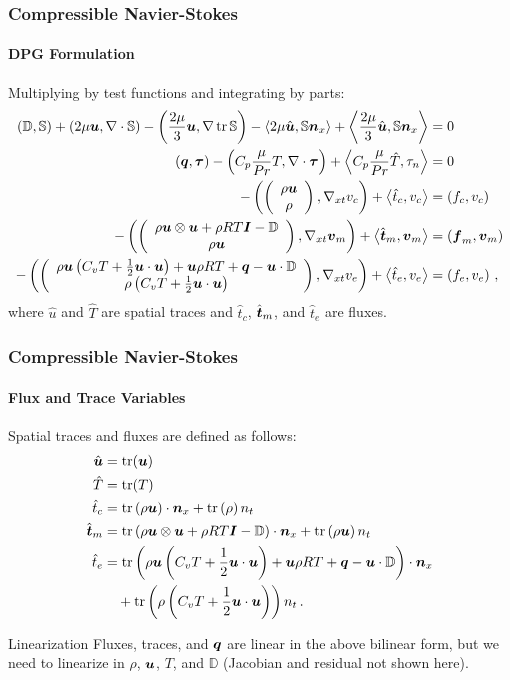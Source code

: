 \documentclass[18pt,xcolor=table]{beamer}
\begin{document}
\begin{frame}[t]
\frametitle{Compressible Navier-Stokes}
\framesubtitle{DPG Formulation}  %
Multiplying by test functions and integrating by parts:
{
\small
\begin{align*}
  \LRp{\mathbb{D},\mathbb{S}}+\LRp{2\mu\bfu,\Div\mathbb{S}}-\LRp{\frac{2\mu}{3}\bfu,\Grad\trace{\mathbb{S}}}
  -\LRa{2\mu\hat\bfu,\mathbb{S}\bfn_x}+\LRa{\frac{2\mu}{3}\hat\bfu,\mathbb{S}\bfn_x}&=0\\
  \LRp{\bfq,\bftau}-\LRp{C_p\frac{\mu}{Pr}T,\Div\bftau}+\LRa{C_p\frac{\mu}{Pr}\hat T,\tau_n}&=0\\
  -\LRp{\vecttwo{\rho\bfu}{\rho},\Gradxt v_c}+\LRa{\hat t_c,v_c}&=\LRp{f_c,v_c}\\
  -\LRp{\vecttwo{\rho\bfu\otimes\bfu+\rho RT\bfI-\mathbb{D}}{\rho\bfu},\Gradxt\bfv_m}+\LRa{\hat\bft_m,\bfv_m}&=\LRp{\bff_m,\bfv_m}\\
  -\LRp{\vecttwo{\rho\bfu\LRp{C_v T+\frac{1}{2}\bfu\cdot\bfu}+\bfu\rho RT+\bfq-\bfu\cdot\mathbb{D}}{\rho\LRp{C_v T+\frac{1}{2}\bfu\cdot\bfu}},\Gradxt v_e}
  +\LRa{\hat t_e,v_e}&=\LRp{f_e,v_e}\,,
\end{align*}
}
where $\hat u$ and $\hat T$ are spatial traces and $\hat t_c$, $\hat\bft_m$, and $\hat t_e$ are fluxes.
\end{frame}


\begin{frame}[t]
\frametitle{Compressible Navier-Stokes}
\framesubtitle{Flux and Trace Variables}  %
Spatial traces and fluxes are defined as follows:
\begin{equation*}
\begin{aligned}
\hat\bfu&=\trace(\bfu)\\
\hat T&=\trace(T)\\
\hat t_c&=\trace\LRp{\rho\bfu}\cdot\bfn_x
+\trace\LRp{\rho}n_t\\
\hat\bft_m&=\trace\LRp{\rho\bfu\otimes\bfu+\rho RT\bfI-\mathbb{D}}\cdot\bfn_x
+\trace\LRp{\rho\bfu} n_t\\
\hat t_e&=\trace\LRp{\rho\bfu\LRp{C_v T+\frac{1}{2}\bfu\cdot\bfu}+\bfu\rho RT+\bfq-\bfu\cdot\mathbb{D}}\cdot\bfn_x\\
&\quad+\trace\LRp{\rho\LRp{C_v T+\frac{1}{2}\bfu\cdot\bfu}}n_t\,.
\end{aligned}
\end{equation*}
\begin{block}{Linearization}
Fluxes, traces, and $\bfq$ are linear in the above bilinear form, but we need to linearize in $\rho$, $\bfu$, $T$, and $\mathbb{D}$ 
(Jacobian and residual not shown here).
\end{block}
\end{frame}
\end{document}
